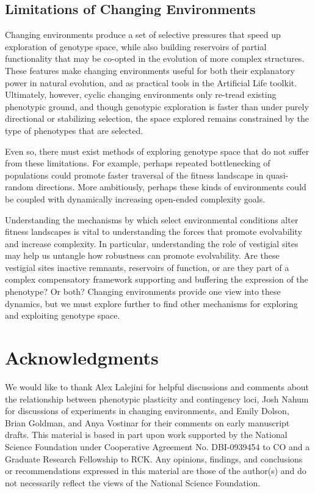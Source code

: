 \documentclass[letterpaper]{article}
\begin{document}
\subsection{Limitations of Changing Environments}
Changing environments produce a set of selective pressures that speed up exploration of genotype space, while also building %
reservoirs of partial functionality that may be co-opted in the evolution of more complex structures. These features make changing environments useful for both their explanatory power in natural evolution, and as practical tools in the Artificial Life toolkit. 
Ultimately, however, cyclic changing environments only re-tread existing phenotypic ground, and though genotypic exploration is faster than under purely directional or stabilizing selection, the space explored remains constrained by the type of phenotypes that are selected.

Even so, there must exist methods of exploring genotype space that do not suffer from these limitations.
For example, perhaps repeated bottlenecking of populations could promote faster traversal of the fitness landscape in quasi-random directions.
More ambitiously, perhaps these kinds of environments could be coupled with dynamically increasing open-ended complexity goals.

Understanding the mechanisms by which select environmental conditions alter fitness landscapes is vital to understanding the forces that promote evolvability and increase complexity.
In particular, understanding the role of vestigial sites may help us untangle how robustness can promote evolvability.
Are these vestigial sites inactive remnants, reservoirs of function, or are they part of a complex compensatory framework supporting and buffering the expression of the phenotype? Or both?
Changing environments provide one view into these dynamics, but we must explore further to find other mechanisms for exploring and exploiting genotype space.

\section{Acknowledgments}
We would like to thank Alex Lalejini for helpful discussions and comments about the relationship between phenotypic plasticity and contingency loci, Josh Nahum for discussions of experiments in changing environments, and Emily Dolson, Brian Goldman, and Anya Vostinar for their comments on early manuscript drafts.
This material is based in part upon work supported by the National Science Foundation under Cooperative Agreement No. DBI-0939454 to CO and a Graduate Research Fellowship to RCK. Any opinions, findings, and conclusions or recommendations expressed in this material are those of the author(s) and do not necessarily reflect the views of the National Science Foundation.



\end{document}
